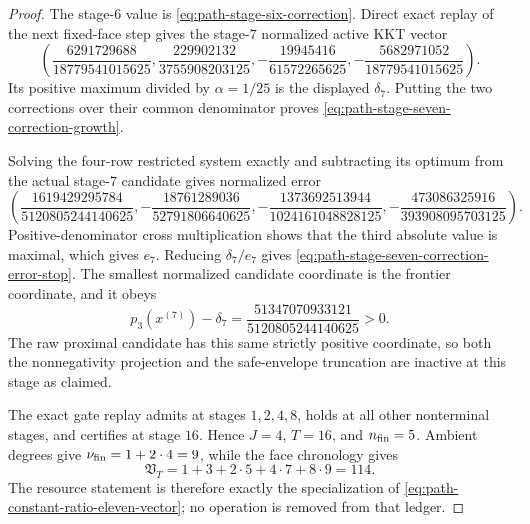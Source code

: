 \begin{proof}
The stage-$6$ value is
\cref{eq:path-stage-six-correction}.  Direct exact replay of the next
fixed-face step gives the stage-$7$ normalized active KKT vector
\begin{equation*}
 \left(
 \frac{6291729688}{18779541015625},
 \frac{229902132}{3755908203125},
 -\frac{19945416}{61572265625},
 -\frac{5682971052}{18779541015625}
 \right).
\end{equation*}
Its positive maximum divided by $\alpha=1/25$ is the displayed $\delta_7$.
Putting the two corrections over their common denominator proves
\cref{eq:path-stage-seven-correction-growth}.

Solving the four-row restricted system exactly and subtracting its optimum
from the actual stage-$7$ candidate gives normalized error
\begin{equation*}
 \left(
 \frac{1619429295784}{5120805244140625},
 -\frac{18761289036}{52791806640625},
 -\frac{1373692513944}{1024161048828125},
 -\frac{473086325916}{393908095703125}
 \right).
\end{equation*}
Positive-denominator cross multiplication shows that the third absolute
value is maximal, which gives $e_7$.  Reducing $\delta_7/e_7$ gives
\cref{eq:path-stage-seven-correction-error-stop}.  The smallest normalized
candidate coordinate is the frontier coordinate, and it obeys
\begin{equation*}
 p_3(x^{(7)})-\delta_7
 =\frac{51347070933121}{5120805244140625}>0.
\end{equation*}
The raw proximal candidate has this same strictly positive coordinate, so
both the nonnegativity projection and the safe-envelope truncation are
inactive at this stage as claimed.

The exact gate replay admits at stages $1,2,4,8$, holds at all other
nonterminal stages, and certifies at stage $16$.  Hence $J=4$, $T=16$, and
$n_{\rm fin}=5$.  Ambient degrees give $\nu_{\rm fin}=1+2\cdot4=9$, while
the face chronology gives
\begin{equation*}
 \mathfrak V_T=1+3+2\cdot5+4\cdot7+8\cdot9=114.
\end{equation*}
The resource statement is therefore exactly the specialization of
\cref{eq:path-constant-ratio-eleven-vector}; no operation is removed from
that ledger.
\end{proof}

